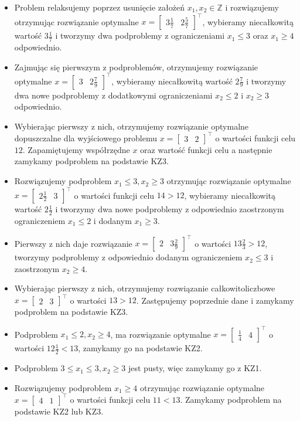 \documentclass[licencjacka]{pracamgr}
\begin{document}
\begin{itemize}
\item Problem relaksujemy poprzez usunięcie założeń $x_1,x_2\in\mathbb{Z}$ i rozwiązujemy otrzymując rozwiązanie optymalne $x=[\begin{array}{cc}3\frac{1}{7}&2\frac{5}{7}\end{array}]^{\top}$,
wybieramy niecałkowitą wartość $3\frac{1}{7}$ i tworzymy dwa podproblemy z ograniczeniami $x_1\le3$ oraz $x_1\ge4$ odpowiednio.
\item Zajmując się pierwszym z podproblemów, otrzymujemy rozwiązanie optymalne \linebreak
$x=[\begin{array}{cc}3&2\frac{7}{9}\end{array}]^{\top}$, wybieramy niecałkowitą wartość $2\frac{7}{9}$
i tworzymy dwa nowe podproblemy z dodatkowymi ograniczeniami $x_2\le2$ i $x_2\ge3$ odpowiednio.
\item Wybierając pierwszy z nich, otrzymujemy rozwiązanie optymalne dopuszczalne dla wyjściowego problemu $x=[\begin{array}{cc}3&2\end{array}]^{\top}$ o wartości funkcji celu $12$.
Zapamiętujemy współrzędne $x$ oraz wartość funkcji celu a następnie zamykamy podproblem na podstawie KZ3.
\item Rozwiązujemy podproblem $x_1\le3,x_2\ge3$ otrzymując rozwiązanie optymalne $x=[\begin{array}{cc}2\frac{1}{2}&3\end{array}]^{\top}$ o wartości funkcji celu $14>12$,
wybieramy niecałkowitą wartość $2\frac{1}{2}$ i tworzymy dwa nowe podproblemy z odpowiednio zaostrzonym ograniczeniem $x_1\le2$ \linebreak i dodanym $x_1\ge 3$.
\item Pierwszy z nich daje rozwiązanie $x=[\begin{array}{cc}2&3\frac{2}{9}\end{array}]^{\top}$ o wartości $13\frac{2}{3}>12$,
tworzymy podproblemy z odpowiednio dodanym ograniczeniem $x_2\le 3$ i zaostrzonym $x_2\ge4$.
\item Wybierając pierwszy z nich, otrzymujemy rozwiązanie całkowitoliczbowe $x=[\begin{array}{cc}2&3\end{array}]^{\top}$ o wartości $13>12$.
Zastępujemy poprzednie dane i zamykamy podproblem na podstawie KZ3.
\item Podproblem $x_1\le2,x_2\ge4$, ma rozwiązanie optymalne $x=[\begin{array}{cc}\frac{1}{4}&4\end{array}]^{\top}$ o wartości \linebreak $12\frac{1}{2}<13$,
zamykamy go na podstawie KZ2.
\item Podproblem $3\le x_1\le3,x_2\ge3$ jest pusty, więc zamykamy go z KZ1.
\item Rozwiązujemy podproblem $x_1\ge4$ otrzymując rozwiązanie optymalne $x=[\begin{array}{cc}4&1\end{array}]^{\top}$ \linebreak o wartości funkcji celu $11<13$.
Zamykamy podproblem na podstawie KZ2 lub KZ3.
\end{itemize}
\end{document}
